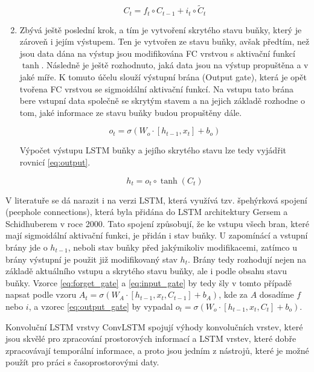 \begin{enumerate}
\begin{equation}
C_t = f_t \circ C_{t-1} + i_t \circ \widetilde{C}_t
\label{eq:cell_state_modification}
\end{equation}


\item Zbývá ještě poslední krok, a tím je vytvoření skrytého stavu buňky, který je zároveň i jejím výstupem.
Ten je vytvořen ze stavu buňky, avšak předtím, než jsou data dána na výstup jsou modifikována FC vrstvou s aktivační funkcí \(\tanh\).
Následně je ještě rozhodnuto, jaká data jsou na výstup propuštěna a v jaké míře.
K tomuto účelu slouží výstupní brána (Output gate), která je opět tvořena FC vrstvou se sigmoidální aktivační funkcí.
Na vstupu tato brána bere vstupní data společně se skrytým stavem a na jejich základě rozhodne o tom, jaké informace ze stavu buňky budou propuštěny dále.

\begin{equation}
o_t = \sigma(W_o \cdot [h_{t-1}, x_t] + b_o)
\label{eq:output_gate}
\end{equation}

Výpočet výstupu LSTM buňky a jejího skrytého stavu lze tedy vyjádřit rovnicí \ref{eq:output}.

\begin{equation}
h_t = o_t \circ \tanh(C_t)
\label{eq:output}
\end{equation}

\end{enumerate}

V literatuře se dá narazit i na verzi LSTM, která využívá tzv. špehýrková spojení (peephole connections), která byla přidána do LSTM architektury Gersem a Schidhuberem v roce 2000. \cite{PeepLSTM}
Tato spojení způsobují, že ke vstupu všech bran, které mají sigmoidální aktivační funkci, je přidán i stav buňky. U zapomínácí a vstupní brány jde o \(h_{t-1}\), neboli stav buňky před jakýmikoliv modifikacemi, zatímco u brány výstupní je použit již modifikovaný stav  \(h_{t}\).
Brány tedy rozhodují nejen na základě aktuálního vstupu a skrytého stavu buňky, ale i podle obsahu stavu buňky.
Vzorce \ref{eq:forget_gate} a \ref{eq:input_gate} by tedy šly v tomto případě napsat podle vzoru \( A_t = \sigma(W_A \cdot [h_{t-1}, x_t, C_{t-1}] + b_A) \), kde za \(A\) dosadíme \(f\) nebo \(i\), a vzorec \ref{eq:output_gate} by vypadal \( o_t = \sigma(W_o \cdot [h_{t-1}, x_t, C_{t}] + b_o) \).


Konvoluční LSTM vrstvy ConvLSTM spojují výhody konvolučních vrstev, které jsou skvělé pro zpracování prostorových informací a LSTM vrstev, které dobře zpracovávají temporální informace, a proto jsou jedním z nástrojů, které je možné použít pro práci s časoprostorovými daty.

